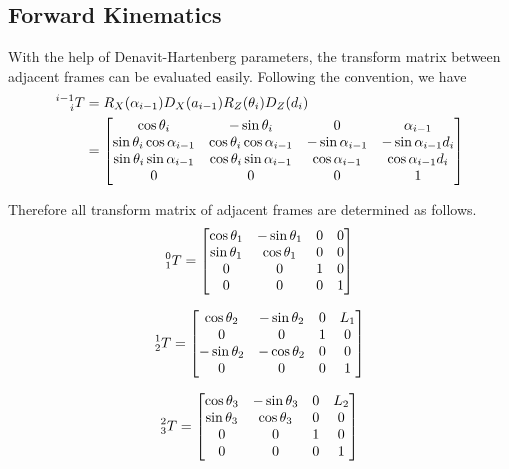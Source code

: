 \documentclass{article}
\begin{document}
\subsection{Forward Kinematics}

With the help of Denavit-Hartenberg parameters, the transform matrix between adjacent frames can be evaluated easily.
Following the convention, we have
\[
    \begin{aligned}
        \prescript{i-1}{i}{T}
        &= R_X (\alpha_{i-1}) D_X (a_{i-1}) R_Z (\theta_i) D_Z (d_i) \\
        &= \begin{bmatrix}
            \cos \theta_i & - \sin \theta_i & 0 & \alpha_{i-1} \\
            \sin \theta_i \cos \alpha_{i-1} & \cos \theta_i \cos \alpha_{i-1} & - \sin \alpha_{i-1} & - \sin \alpha_{i-1} d_i \\
            \sin \theta_i \sin \alpha_{i-1} & \cos \theta_i \sin \alpha_{i-1} & \cos \alpha_{i-1} & \cos \alpha_{i-1} d_i \\
            0 & 0 & 0 & 1
        \end{bmatrix}
    \end{aligned}
\]

Therefore all transform matrix of adjacent frames are determined as follows.
\[
    \prescript{0}{1}{T} =
    \begin{bmatrix}
        \cos \theta_1 & - \sin \theta_1 & 0 & 0 \\
        \sin \theta_1 & \cos \theta_1 & 0 & 0 \\
        0 & 0 & 1 & 0 \\
        0 & 0 & 0 & 1
    \end{bmatrix}
\]

\[
    \prescript{1}{2}{T} =
    \begin{bmatrix}
        \cos \theta_2 & - \sin \theta_2 & 0 & L_1 \\
        0 & 0 & 1 & 0 \\
        -\sin \theta_2 & - \cos \theta_2 & 0 & 0 \\
        0 & 0 & 0 & 1
    \end{bmatrix}
\]

\[
    \prescript{2}{3}{T} =
    \begin{bmatrix}
        \cos \theta_3 & - \sin \theta_3 & 0 & L_2 \\
        \sin \theta_3 & \cos \theta_3 & 0 & 0 \\
        0 & 0 & 1 & 0 \\
        0 & 0 & 0 & 1
    \end{bmatrix}
\]
\end{document}
